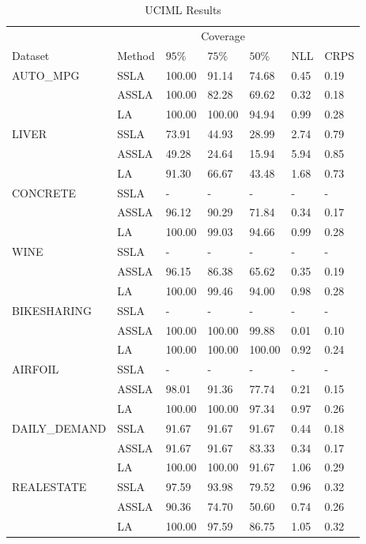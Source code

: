 \begin{table}
\centering
\begin{tabular}{lllllll}
  &  & \multicolumn{3}{c}{Coverage} & \multicolumn{2}{c}{} \\ 
\cline{3-5} 
Dataset & Method & $95\%$ & $75\%$ & $50\%$ & NLL & CRPS \\\hline
 \multirow{3}{*}{AUTO_MPG} & SSLA & 100.00 & 91.14 & 74.68 & 0.45 & 0.19 \\
 & ASSLA & 100.00 & 82.28 & 69.62 & 0.32 & 0.18 \\
 & LA & 100.00 & 100.00 & 94.94 & 0.99 & 0.28 \\\hline
\multirow{3}{*}{LIVER} & SSLA & 73.91 & 44.93 & 28.99 & 2.74 & 0.79 \\
 & ASSLA & 49.28 & 24.64 & 15.94 & 5.94 & 0.85 \\
 & LA & 91.30 & 66.67 & 43.48 & 1.68 & 0.73 \\\hline
\multirow{3}{*}{CONCRETE} & SSLA & - & - & - & - & - \\
 & ASSLA & 96.12 & 90.29 & 71.84 & 0.34 & 0.17 \\
 & LA & 100.00 & 99.03 & 94.66 & 0.99 & 0.28 \\\hline
\multirow{3}{*}{WINE} & SSLA & - & - & - & - & - \\
 & ASSLA & 96.15 & 86.38 & 65.62 & 0.35 & 0.19 \\
 & LA & 100.00 & 99.46 & 94.00 & 0.98 & 0.28 \\\hline
\multirow{3}{*}{BIKESHARING} & SSLA & - & - & - & - & - \\
 & ASSLA & 100.00 & 100.00 & 99.88 & 0.01 & 0.10 \\
 & LA & 100.00 & 100.00 & 100.00 & 0.92 & 0.24 \\\hline
\multirow{3}{*}{AIRFOIL} & SSLA & - & - & - & - & - \\
 & ASSLA & 98.01 & 91.36 & 77.74 & 0.21 & 0.15 \\
 & LA & 100.00 & 100.00 & 97.34 & 0.97 & 0.26 \\\hline
\multirow{3}{*}{DAILY_DEMAND} & SSLA & 91.67 & 91.67 & 91.67 & 0.44 & 0.18 \\
 & ASSLA & 91.67 & 91.67 & 83.33 & 0.34 & 0.17 \\
 & LA & 100.00 & 100.00 & 91.67 & 1.06 & 0.29 \\\hline
\multirow{3}{*}{REALESTATE} & SSLA & 97.59 & 93.98 & 79.52 & 0.96 & 0.32 \\
 & ASSLA & 90.36 & 74.70 & 50.60 & 0.74 & 0.26 \\
 & LA & 100.00 & 97.59 & 86.75 & 1.05 & 0.32 \\\hline 
\end{tabular}
\caption{UCIML Results}
\label{tab:uciml_results}
\end{table}